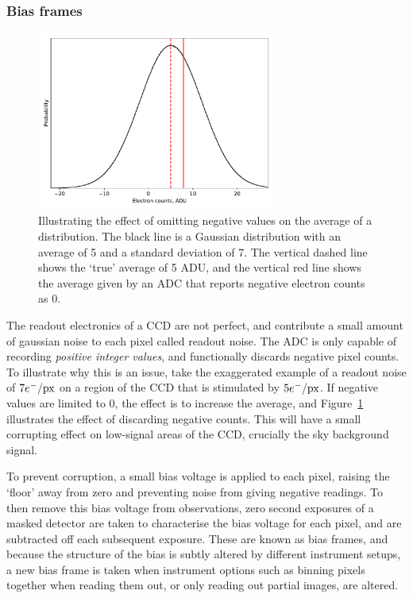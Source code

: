 \subsubsection{Bias frames}

\begin{figure}
    \centering
    \includegraphics[width=0.7\textwidth]{figures/observations/bias_frame_histogram.pdf}
    \caption{Illustrating the effect of omitting negative values on the average of a distribution. The black line is a Gaussian distribution with an average of 5 and a standard deviation of 7. The vertical dashed line shows the `true' average of 5 ADU, and the vertical red line shows the average given by an ADC that reports negative electron counts as 0.}
    \label{fig:observations:bias frame histogram}
\end{figure}
The readout electronics of a CCD are not perfect, and contribute a small amount of gaussian noise to each pixel called readout noise. The ADC is only capable of recording {\it positive integer values}, and functionally discards negative pixel counts. To illustrate why this is an issue, take the exaggerated example of a readout noise of $7 e^-/{\rm px}$ on a region of the CCD that is stimulated by $5 e^-/{\rm px}$. If negative values are limited to 0, the effect is to increase the average, and Figure~\ref{fig:observations:bias frame histogram} illustrates the effect of discarding negative counts.
This will have a small corrupting effect on low-signal areas of the CCD, crucially the sky background signal.

To prevent corruption, a small bias voltage is applied to each pixel, raising the `floor' away from zero and preventing noise from giving negative readings. To then remove this bias voltage from observations, zero second exposures of a masked detector are taken to characterise the bias voltage for each pixel, and are subtracted off each subsequent exposure. These are known as bias frames, and because the structure of the bias is subtly altered by different instrument setups, a new bias frame is taken when instrument options such as binning pixels together when reading them out, or only reading out partial images, are altered. 


